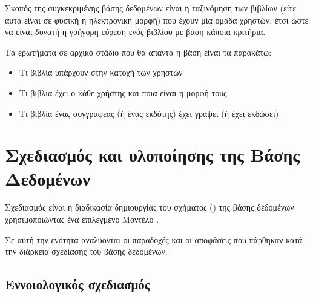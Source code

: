 \documentclass{assignment}
\begin{document}

Σκοπός της συγκεκριμένης βάσης δεδομένων είναι η ταξινόμηση των βιβλίων (είτε αυτά είναι σε φυσική ή ηλεκτρονική μορφή) που έχουν μία ομάδα χρηστών, έτσι ώστε να είναι δυνατή η γρήγορη εύρεση ενός βιβλίου με βάση κάποια κριτήρια. 

Τα ερωτήματα σε αρχικό στάδιο που θα απαντά η βάση είναι τα παρακάτω:
\begin{itemize}
  \item Τι βιβλία υπάρχουν στην κατοχή των χρηστών
  \item Τι βιβλία έχει ο κάθε χρήστης και ποια είναι η μορφή τους
  \item Τι βιβλία ένας συγγραφέας (ή ένας εκδότης) έχει γράψει (ή έχει εκδώσει)
\end{itemize}





\section{Σχεδιασμός και υλοποίησης της Βάσης Δεδομένων}

Σχεδιασμός είναι η διαδικασία δημιουργίας του σχήματος () της βάσης δεδομένων χρησιμοποιώντας ένα επιλεγμένο Μοντέλο \cite{class_notes}.

Σε αυτή την ενότητα αναλύονται οι παραδοχές και οι αποφάσεις που πάρθηκαν κατά την διάρκεια σχεδίασης του βάσης δεδομένων.

\subsection{Εννοιολογικός σχεδιασμός}
\end{document}
